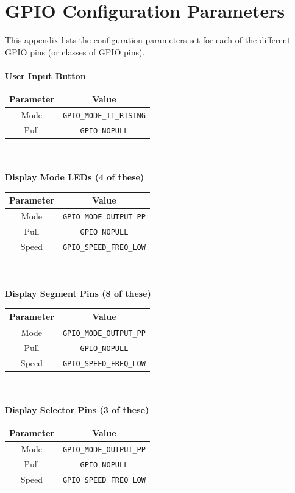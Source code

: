 \documentclass[12pt]{report}
\begin{document}
\begin{appendix}\label{appendices}
	\chapter{GPIO Configuration Parameters}\label{appendixgpio}
	This appendix lists the configuration parameters set for each of the different GPIO pins (or
	classes of GPIO pins).\\\\
	\textbf{User Input Button}\\
	\begin{tabular}{|c|c|}
		\hline
		Parameter & Value\\\hline
		Mode & \texttt{GPIO\_MODE\_IT\_RISING}\\\hline
		Pull & \texttt{GPIO\_NOPULL}\\\hline
	\end{tabular}
	\newline
	\\\\
	\textbf{Display Mode LEDs (4 of these)}\\
	\begin{tabular}{|c|c|}
		\hline
		Parameter & Value\\\hline
		Mode & \texttt{GPIO\_MODE\_OUTPUT\_PP}\\\hline
		Pull & \texttt{GPIO\_NOPULL}\\\hline
		Speed & \texttt{GPIO\_SPEED\_FREQ\_LOW}\\\hline
	\end{tabular}
	\newline
	\\\\
	\textbf{Display Segment Pins (8 of these)}\\
	\begin{tabular}{|c|c|}
		\hline
		Parameter & Value\\\hline
		Mode & \texttt{GPIO\_MODE\_OUTPUT\_PP}\\\hline
		Pull & \texttt{GPIO\_NOPULL}\\\hline
		Speed & \texttt{GPIO\_SPEED\_FREQ\_LOW}\\\hline
	\end{tabular}
	\newline
	\\\\
	\textbf{Display Selector Pins (3 of these)}\\
	\begin{tabular}{|c|c|}
		\hline
		Parameter & Value\\\hline
		Mode & \texttt{GPIO\_MODE\_OUTPUT\_PP}\\\hline
		Pull & \texttt{GPIO\_NOPULL}\\\hline
		Speed & \texttt{GPIO\_SPEED\_FREQ\_LOW}\\\hline
	\end{tabular}
	\newline
	\newpage

\end{appendix}
\end{document}
